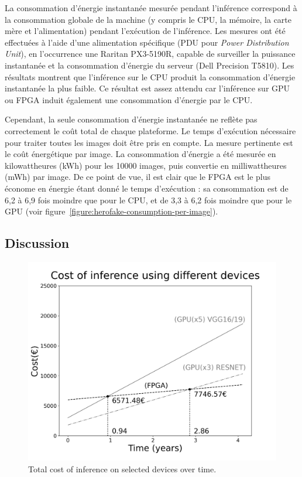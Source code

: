 La consommation d'énergie instantanée mesurée pendant l'inférence correspond à la consommation globale de la machine (y compris le CPU, la mémoire, la carte mère et l'alimentation) pendant l'exécution de l'inférence.
Les mesures ont été effectuées à l'aide d'une alimentation spécifique (PDU pour \textit{Power Distribution Unit}), en l'occurrence une Raritan PX3-5190R, capable de surveiller la puissance instantanée et la consommation d'énergie du serveur (Dell Precision T5810). Les résultats montrent que l'inférence sur le CPU produit la consommation d'énergie instantanée la plus faible. Ce résultat est assez attendu car l'inférence sur GPU ou FPGA induit également une consommation d'énergie par le CPU.

Cependant, la seule consommation d'énergie instantanée ne reflète pas correctement le coût total de chaque plateforme. Le temps d'exécution nécessaire pour traiter toutes les images doit être pris en compte. La mesure pertinente est le coût énergétique par image. La consommation d'énergie a été mesurée en kilowattheures (kWh) pour les 10000 images, puis convertie en milliwattheures (mWh) par image. De ce point de vue, il est clair que le FPGA est le plus économe en énergie étant donné le temps d'exécution : sa consommation est de 6,2 à 6,9 fois moindre que pour le CPU, et de 3,3 à 6,2 fois moindre que pour le GPU (voir figure~\ref{figure:herofake-consumption-per-image}).

\subsection{Discussion}

\begin{figure}[t]
\centering
\includegraphics[scale=0.2]{4_Chapitre4/figures/characterization/cost_devices_time.png}
\caption{Total cost of inference on selected devices over time.}
\label{figure:herofake-cost-over-time}
\end{figure}

